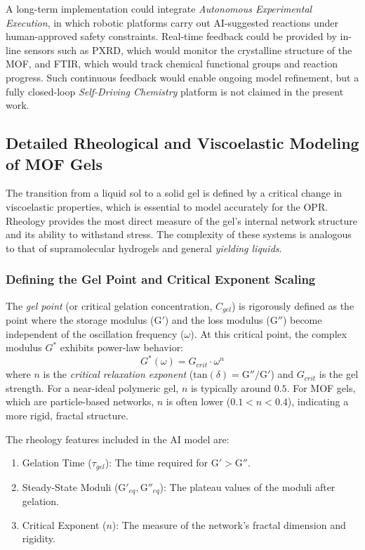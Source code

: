 \documentclass[12pt,a4paper]{article}
\begin{document}
A long-term implementation could integrate \textit{Autonomous Experimental Execution}, in which robotic platforms carry out AI-suggested reactions under human-approved safety constraints. Real-time feedback could be provided by in-line sensors such as PXRD, which would monitor the crystalline structure of the MOF, and FTIR, which would track chemical functional groups and reaction progress. Such continuous feedback would enable ongoing model refinement, but a fully closed-loop \textit{Self-Driving Chemistry} platform is not claimed in the present work.\cite{ref19}

\subsection{Detailed Rheological and Viscoelastic Modeling of MOF Gels}

The transition from a liquid sol to a solid gel is defined by a critical change in viscoelastic properties, which is essential to model accurately for the OPR. Rheology provides the most direct measure of the gel's internal network structure and its ability to withstand stress. The complexity of these systems is analogous to that of supramolecular hydrogels\cite{ref37} and general \textit{yielding liquids}.\cite{ref38}

\subsubsection{Defining the Gel Point and Critical Exponent Scaling}

The \textit{gel point} (or critical gelation concentration, $C_{gel}$) is rigorously defined as the point where the storage modulus ($\text{G}'$) and the loss modulus ($\text{G}''$) become independent of the oscillation frequency ($\omega$). At this critical point, the complex modulus $G^*$ exhibits power-law behavior:
\[
G^*(\omega) = G_{crit} \cdot \omega^n
\]
where $n$ is the \textit{critical relaxation exponent} ($\text{tan}(\delta) = \text{G}'' / \text{G}'$) and $G_{crit}$ is the gel strength. For a near-ideal polymeric gel, $n$ is typically around $0.5$. For MOF gels, which are particle-based networks, $n$ is often lower ($0.1 < n < 0.4$), indicating a more rigid, fractal structure.

The rheology features included in the AI model are:
\begin{enumerate}
    \item Gelation Time ($\tau_{gel}$): The time required for $\text{G}' > \text{G}''$.
    \item Steady-State Moduli ($\text{G}'_{eq}, \text{G}''_{eq}$): The plateau values of the moduli after gelation.
    \item Critical Exponent ($n$): The measure of the network's fractal dimension and rigidity.
\end{enumerate}
\end{document}
